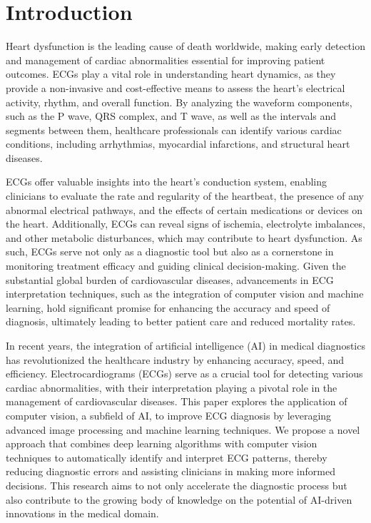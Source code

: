 \documentclass[10pt,twocolumn,letterpaper]{article}
\begin{document}




\section{Introduction}
\label{sec:intro}
Heart dysfunction is the leading cause of death worldwide, making early detection and management of cardiac abnormalities essential for improving patient outcomes. ECGs play a vital role in understanding heart dynamics, as they provide a non-invasive and cost-effective means to assess the heart's electrical activity, rhythm, and overall function. By analyzing the waveform components, such as the P wave, QRS complex, and T wave, as well as the intervals and segments between them, healthcare professionals can identify various cardiac conditions, including arrhythmias, myocardial infarctions, and structural heart diseases.

ECGs offer valuable insights into the heart's conduction system, enabling clinicians to evaluate the rate and regularity of the heartbeat, the presence of any abnormal electrical pathways, and the effects of certain medications or devices on the heart. Additionally, ECGs can reveal signs of ischemia, electrolyte imbalances, and other metabolic disturbances, which may contribute to heart dysfunction. As such, ECGs serve not only as a diagnostic tool but also as a cornerstone in monitoring treatment efficacy and guiding clinical decision-making. Given the substantial global burden of cardiovascular diseases, advancements in ECG interpretation techniques, such as the integration of computer vision and machine learning, hold significant promise for enhancing the accuracy and speed of diagnosis, ultimately leading to better patient care and reduced mortality rates.

In recent years, the integration of artificial intelligence (AI) in medical diagnostics has revolutionized the healthcare industry by enhancing accuracy, speed, and efficiency. Electrocardiograms (ECGs) serve as a crucial tool for detecting various cardiac abnormalities, with their interpretation playing a pivotal role in the management of cardiovascular diseases. This paper explores the application of computer vision, a subfield of AI, to improve ECG diagnosis by leveraging advanced image processing and machine learning techniques. We propose a novel approach that combines deep learning algorithms with computer vision techniques to automatically identify and interpret ECG patterns, thereby reducing diagnostic errors and assisting clinicians in making more informed decisions. This research aims to not only accelerate the diagnostic process but also contribute to the growing body of knowledge on the potential of AI-driven innovations in the medical domain.
\end{document}
